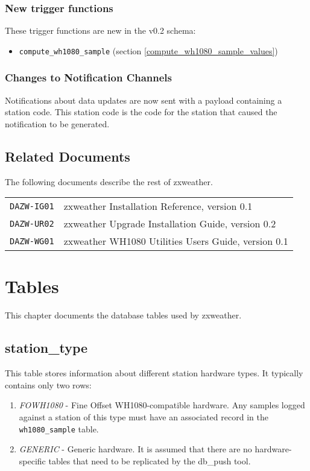 \documentclass[a4paper,10pt]{book}
\begin{document}
\subsection{New trigger functions}
These trigger functions are new in the v0.2 schema:
\begin{itemize}
\item \verb|compute_wh1080_sample| (section \ref{compute_wh1080_sample_values})
\end{itemize}

\subsection{Changes to Notification Channels}
Notifications about data updates are now sent with a payload containing a station code. This station code is the code for the station that caused the notification to be generated.

\section{Related Documents}
The following documents describe the rest of zxweather.

\begin{tabular}{l l}
\verb|DAZW-IG01| & zxweather Installation Reference, version 0.1 \\
\verb|DAZW-UR02| & zxweather Upgrade Installation Guide, version 0.2\\
\verb|DAZW-WG01| & zxweather WH1080 Utilities Users Guide, version 0.1 \\
\end{tabular}

\chapter{Tables}
\label{cha_tables}

This chapter documents the database tables used by zxweather.

\section{station\_type}
\label{tbl_station_type}
This table stores information about different station hardware types. It typically contains only two rows:
\begin{enumerate}
\item \emph{FOWH1080} - Fine Offset WH1080-compatible hardware. Any samples logged against a station of this type must have an associated record in the \verb|wh1080_sample| table.
\item \emph{GENERIC} - Generic hardware. It is assumed that there are no hardware-specific tables that need to be replicated by the db\_push tool.
\end{enumerate}
\end{document}
